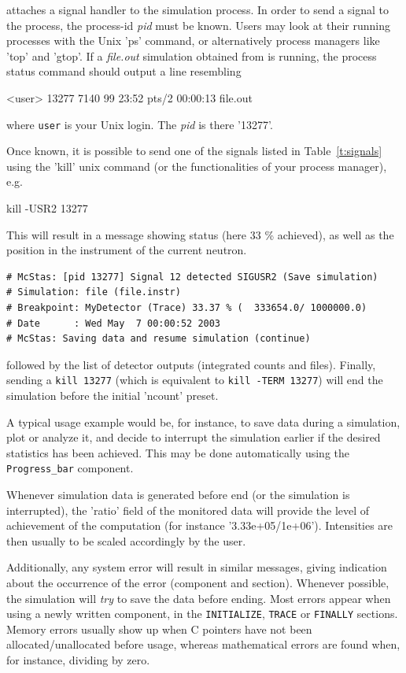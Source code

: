 \MCS attaches a signal handler to the simulation process. In order to send a signal to the process, the process-id \textit{pid} must be known. Users may look at their running processes with the Unix 'ps' command, or alternatively process managers like 'top' and 'gtop'.
If a \textit{file.out} simulation obtained from \MCS is running, the process status command should output a line resembling

\begin{bash}
<user> 13277 7140 99 23:52 pts/2   00:00:13   file.out
\end{bash}

where \verb+user+ is your Unix login. The \textit{pid} is there '13277'.

Once known, it is possible to send one of the signals listed in Table~\ref{t:signals} using the 'kill' unix command (or the functionalities of your process manager), e.g.
\begin{bash}
    kill -USR2 13277
\end{bash}

This will result in a message showing status (here 33 \% achieved), as well as the position in the instrument of the current neutron.
\begin{lstlisting}
# McStas: [pid 13277] Signal 12 detected SIGUSR2 (Save simulation)
# Simulation: file (file.instr)
# Breakpoint: MyDetector (Trace) 33.37 % (  333654.0/ 1000000.0)
# Date      : Wed May  7 00:00:52 2003
# McStas: Saving data and resume simulation (continue)
\end{lstlisting}
followed by the list of detector outputs (integrated counts and files). Finally, sending a \verb+kill 13277+ (which is equivalent to \verb+kill -TERM 13277+) will end the simulation before the initial 'ncount' preset.

A typical usage example would be, for instance, to save data during a
simulation, plot or analyze it, and decide to interrupt the simulation earlier
if the desired statistics has been achieved. This may be done automatically
using the \verb+Progress_bar+ component.

Whenever simulation data is generated before end (or the simulation is
interrupted), the 'ratio' field of the monitored data will provide the level of
achievement of the computation (for instance '3.33e+05/1e+06'). Intensities are
then usually to be scaled accordingly by the user.

Additionally, any system error will result in similar messages, giving
indication about the occurrence of the error (component and section). Whenever
possible, the simulation will {\em try} to save the data before ending. Most
errors appear when using a newly written component, in the \texttt{INITIALIZE},
\texttt{TRACE} or \texttt{FINALLY} sections. Memory errors usually show up when
C pointers have not been allocated/unallocated before usage, whereas
mathematical errors are found when, for instance, dividing by zero.

